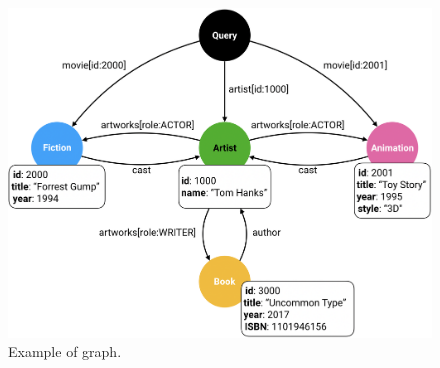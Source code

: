 \begin{figure}
    \centering
    \includegraphics[scale=0.32]{imgs/graph.png}
    \caption{Example of \gql graph.}
    \label{fig:graph_ex}
\end{figure}




